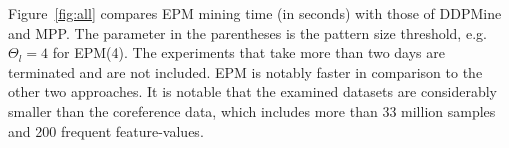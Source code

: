 Figure~\ref{fig:all} compares EPM mining time (in seconds) with those of DDPMine and MPP.
The parameter in the parentheses is the pattern size threshold, e.g.\ $\Theta_l=4$ for EPM(4).
The experiments that take more than two days are terminated and are not included.
EPM is notably faster in comparison to the other two approaches.
It is notable that the examined datasets are considerably smaller than the coreference data, which includes more than 33 million samples and 200 frequent feature-values.